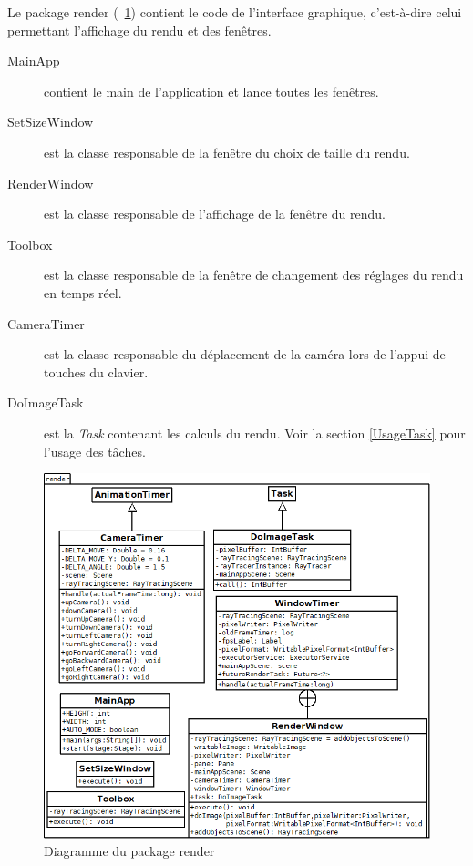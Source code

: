 Le package render (\figurename\ \ref{diagRender}) contient le code de l'interface graphique, c'est-à-dire celui permettant l'affichage du rendu et des fenêtres.

\begin{description}
    \item [MainApp] contient le main de l'application et lance toutes les fenêtres.
    \item [SetSizeWindow] est la classe responsable de la fenêtre du choix de taille du rendu.
    \item [RenderWindow] est la classe responsable de l'affichage de la fenêtre du rendu.
    \item [Toolbox] est la classe responsable de la fenêtre de changement des réglages du rendu en temps réel.
    \item [CameraTimer] est la classe responsable du déplacement de la caméra lors de l'appui de touches du clavier.
    \item [DoImageTask] est la \textit{Task} contenant les calculs du rendu. Voir la section \ref{UsageTask} pour l'usage des tâches.
\end{description}



\begin{figure}[h]
   \begin{center}
       \includegraphics[scale=0.5]{img/render.javafx/diagClassRender.png}
   \end{center}
   \caption{Diagramme du package render \label{diagRender}}
\end{figure}
\FloatBarrier
